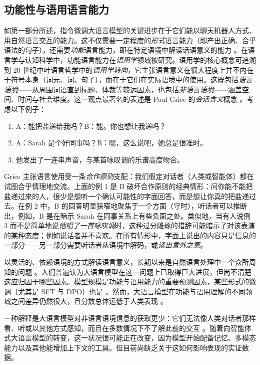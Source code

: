 \subsection{功能性与语用语言能力}
如第一部分所述，指令微调大语言模型的关键进步在于它们能以聊天机器人方式、用自然语言交互的能力。这不仅需要一定程度的\emph{形式}语言能力（即产出正确、合乎语法的句子），还需要\emph{功能}语言能力，即在特定语境中解读话语意义的能力 \citep{mahowald2023dissociating}。在语言学与认知科学中，功能语言能力在{\em 语用学}领域被研究。语用学的核心概念可追溯到 20 世纪中叶语言哲学中的{\em 语用学转向}，它主张语言意义在很大程度上并不内在于符号本身（词元、词、句子），而在于它们在实际语境中的使用。这既包括\emph{语言语境}——从周围词语直到标题、体裁等较远因素，也包括\emph{非语言语境}——涵盖空间、时间与社会维度。这一观点最著名的表述是 Paul Grice 的\emph{会话含义}概念 \citep{Grice_1975}。考虑以下例子：

\begin{enumerate}
    \item A：能把盐递给我吗？B：能。你也想让我递吗？
    \item A：Sarah 是个好同事吗？B：嗯，这么说吧，她总是很准时。
    \item 他发出了一连串声音，与某首咏叹调的乐谱高度吻合。
\end{enumerate}
%
Grice 主张语言使用受一条\emph{合作原则}支配：我们假定对话者（人类或智能体）都在试图合乎情理地交流。上面的例 1 是 B 破坏合作原则的经典情形：问你能不能把盐递过来的人，很少是想听一个确认可能性的字面回答，而是想让你真的把盐递过去。在例 2 中，B 的回答明显狭窄地聚焦于一个方面（守时），听话者可以推断出，例如，B 是在暗示 Sarah 在同事关系上有些负面之处。类似地，当有人说例 3 而不是简单地说{\em 他唱了一首咏叹调}时，这种过分雕琢的措辞可能暗示了对该表演的某种态度；例如说话者并不喜欢。在所有情形中，字面上说出的内容只是信息的一部分——另一部分需要听话者从语境中解码，或{\em 读出言外之意}。

以灵活的、依赖语境的方式解读语言意义，长期以来是自然语言处理中一个众所周知的问题 \citep{trott-etal-2020-construing}。人们普遍认为大语言模型在这一问题上已取得巨大进展，但尚不清楚这应归因于哪些因素。模型规模是功能与语用能力的重要预测因素，某些形式的微调（尤其是 SFT 与 DPO）也是 \citep{yu-etal-2026-pragmatic, ruis2023goldilocks}。然而，大语言模型在功能与语用理解的不同领域之间差异仍然很大，且分数总体远低于人类表现 \citep{sravanthi2024-pub}。

一种解释是大语言模型对非语言语境信息的获取更少：它们无法像人类对话者那样看、听或以其他方式感知，而且在多数情况下不了解此前的交互 \citep{vandermeulen2025properly}。随着向智能体式大语言模型的转变，这一状况很可能正在改变，因为模型开始配备记忆、多模态能力以及其他能增加上下文的工具。但目前尚缺乏关于这如何影响表现的实证数据。

